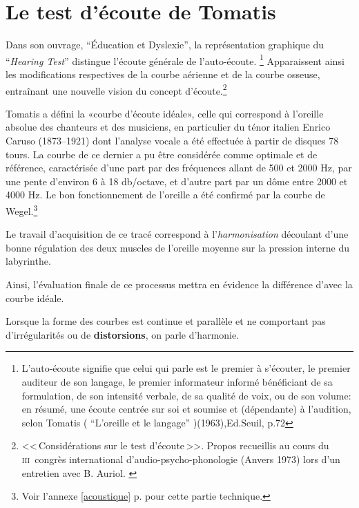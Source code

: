 
\section{Le test d'écoute de Tomatis}


Dans son ouvrage, ``Éducation et
    Dyslexie'',\autocite{tomatis:education} la représentation graphique du 
 ``\emph{Hearing Test}'' distingue l'écoute générale de
 l'auto-écoute. \footnote{ L'auto-écoute signifie que celui qui parle
   est le premier à s'écouter, le premier auditeur de son langage, le
   premier informateur informé bénéficiant de sa formulation, de son
   intensité verbale, de sa qualité de voix, ou de son volume: en
   résumé, une écoute
   centrée sur soi et soumise et (dépendante) à l'audition, selon Tomatis ( ``L'oreille et le langage'' )(1963),Ed.Seuil, p.72}
 Apparaissent ainsi les modifications respectives
 de la courbe aérienne et de la courbe osseuse, entraînant une nouvelle vision
 du concept d'écoute.\footnote{<<\,Considérations sur le test d'écoute\,>>. Propos
  	recueillis au cours du \textsc{iii}\ieme\ congrès international
  	d'audio-psycho-phonologie (Anvers 1973) lors d'un entretien
        avec B. Auriol. \autocite{auriol_stress}}





Tomatis a défini la «courbe d'écoute idéale», celle qui correspond à l'oreille absolue
des chanteurs et des musiciens, en particulier du ténor italien Enrico
Caruso (1873--1921) dont l'analyse vocale a été effectuée à partir de
disques 78 tours. La courbe de ce dernier a pu être considérée comme
optimale et de référence, caractérisée d'une part par des fréquences allant de 500 et 2000
Hz, par une pente d\textquoteright environ 6 à 18 db/octave,
et d'autre part par un dôme entre 2000 et 4000 Hz.
Le bon fonctionnement de l'oreille a été confirmé par la courbe
de Wegel.\footnote{
		Voir l'annexe \ref{acoustique} p. \pageref{acoustique}
		 pour cette partie technique.}
               

Le travail d'acquisition de ce tracé correspond à l'\textsl{harmonisation}
découlant d'une bonne régulation des deux muscles de l'oreille moyenne
sur la pression interne du
labyrinthe.

Ainsi, l'évaluation finale de ce processus mettra en évidence la différence
d'avec la courbe idéale.

Lorsque la forme des 
courbes est continue et parallèle et ne comportant pas d'irrégularités ou
de \textbf{distorsions},
on parle d'harmonie.

